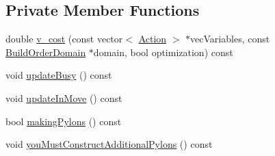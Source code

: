 \subsection*{Private Member Functions}
\begin{DoxyCompactItemize}
\item 
double \hyperlink{classghost_1_1BuildOrderObjective_a8374173fe58843718dc7ba1410628e72}{v\-\_\-cost} (const vector$<$ \hyperlink{classghost_1_1Action}{Action} $>$ $\ast$vec\-Variables, const \hyperlink{classghost_1_1BuildOrderDomain}{Build\-Order\-Domain} $\ast$domain, bool optimization) const 
\item 
void \hyperlink{classghost_1_1BuildOrderObjective_abf798bcb896d5311038e9c882a5314b6}{update\-Busy} () const 
\item 
void \hyperlink{classghost_1_1BuildOrderObjective_a6f1e369381790f195420562d9eb68c66}{update\-In\-Move} () const 
\item 
bool \hyperlink{classghost_1_1BuildOrderObjective_a0704c4f68c1a77436dfa88af016cd952}{making\-Pylons} () const 
\item 
void \hyperlink{classghost_1_1BuildOrderObjective_a2f814ebbd373a2aa9fd316f987de352c}{you\-Must\-Construct\-Additional\-Pylons} () const 
\end{DoxyCompactItemize}


